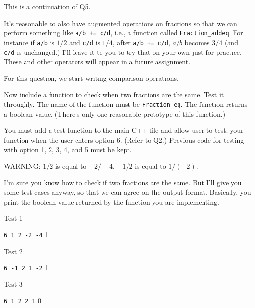 This is a continuation of Q5.

It's reasonable to also have augmented operations on fractions so that
we can perform something like \verb!a/b += c/d!, i.e., a function
called \verb!Fraction_addeq!.
For instance if \verb!a/b! is $1/2$ and \verb!c/d! is $1/4$,
after \verb!a/b += c/d!, $a/b$ becomes $3/4$ (and \verb!c/d! is unchanged.)
I'll leave it to you to try that on your own just for practice.
These and other operators will appear in a future assignment.

For this question, we start writing comparison operations.

Now include a function to check when two fractions are the same.
Test it throughly.
The name of the function must be \verb!Fraction_eq!.
The function returns a boolean value.
(There's only one reasonable prototype of this function.)

You must add a test function to the main C++ file and allow user to test.
your function when the user enters option 6. (Refer to Q2.)
Previous code for testing with option 1, 2, 3, 4, and 5 must be kept.


WARNING: $1/2$ is equal to $-2/-4$, $-1/2$ is equal to $1/(-2)$.

I'm sure you know how to check if two fractions are the same.
But I'll give you some test cases anyway, so that we can agree on the
output format. Basically, you print the boolean value returned by the
function you are implementing.

Test 1
\begin{console}[commandchars=\\\{\}]
\underline{\texttt{6 1 2 -2 -4}}
1
\end{console}

Test 2
\begin{console}[commandchars=\\\{\}]
\underline{\texttt{6 -1 2 1 -2}}
1
\end{console}

Test 3
\begin{console}[commandchars=\\\{\}]
\underline{\texttt{6 1 2 2 1}}
0
\end{console}

